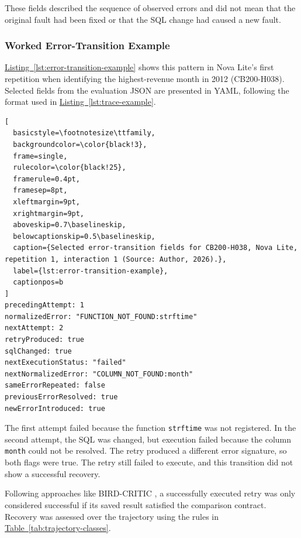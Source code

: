 These fields described the sequence of observed errors and did not mean
that the original fault had been fixed or that the SQL change had caused
a new fault.

\subsubsection{Worked Error-Transition Example}

\hyperref[lst:error-transition-example]{Listing~\ref*{lst:error-transition-example}} shows this pattern in Nova Lite's first repetition
when identifying the highest-revenue month in 2012 (CB200-H038).
Selected fields from the
evaluation JSON are presented in YAML, following the format used in
\hyperref[lst:trace-example]{Listing~\ref*{lst:trace-example}}.

\noindent\begin{minipage}{\linewidth}
\begin{lstlisting}[
  basicstyle=\footnotesize\ttfamily,
  backgroundcolor=\color{black!3},
  frame=single,
  rulecolor=\color{black!25},
  framerule=0.4pt,
  framesep=8pt,
  xleftmargin=9pt,
  xrightmargin=9pt,
  aboveskip=0.7\baselineskip,
  belowcaptionskip=0.5\baselineskip,
  caption={Selected error-transition fields for CB200-H038, Nova Lite, repetition 1, interaction 1 (Source: Author, 2026).},
  label={lst:error-transition-example},
  captionpos=b
]
precedingAttempt: 1
normalizedError: "FUNCTION_NOT_FOUND:strftime"
nextAttempt: 2
retryProduced: true
sqlChanged: true
nextExecutionStatus: "failed"
nextNormalizedError: "COLUMN_NOT_FOUND:month"
sameErrorRepeated: false
previousErrorResolved: true
newErrorIntroduced: true
\end{lstlisting}
\end{minipage}

The first attempt failed because the function \texttt{strftime} was not
registered. 
In the second attempt, the SQL was changed, but execution failed because the column
\texttt{month} could not be resolved. 
The retry produced a different error signature, so both flags were true. 
The retry still failed to execute, and this
transition did not show a successful recovery.

Following approaches like BIRD-CRITIC \citep{li2025swesql}, 
a successfully executed retry was only considered successful 
if its saved result satisfied the comparison contract.
Recovery was assessed over the trajectory using the rules in
\hyperref[tab:trajectory-classes]{Table~\ref*{tab:trajectory-classes}}.

